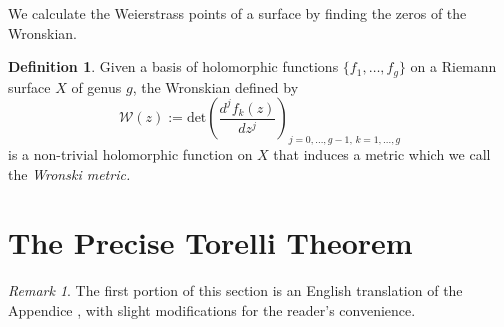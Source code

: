 \documentclass[12pt,reqno]{amsart}
\newcommand{\R}{\mathbb{R}}
\theoremstyle{definition}
\newtheorem{defn}{Definition}
\theoremstyle{remark}
\newtheorem*{remark}{Remark}
\newcommand{\ti}{\todo[inline]}
\begin{document}
We calculate the Weierstrass points of a surface by finding the zeros of the Wronskian.
\begin{defn} Given a basis of holomorphic functions $\{f_1, \ldots , f_g\}$ on a Riemann surface $X$ of genus $g$, the Wronskian defined by $$\mathcal{W}(z) := \textrm{det} \left( \frac{d^j f_k(z)}{d z^j} \right)_{j = 0, \ldots , g - 1, \, k = 1, \ldots , g}$$ is a non-trivial holomorphic function on $X$ that induces a metric which we call the \textit{Wronski metric.} 
\end{defn}







\section{The Precise Torelli Theorem}
\label{sec:torelli}
\begin{remark} The first portion of this section is an English translation of the Appendice \cite{Torelli}, with slight modifications for the reader's convenience.\end{remark}
\end{document}
